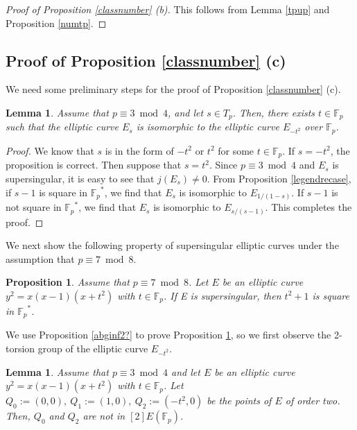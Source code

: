 \documentclass[a4paper, 11pt]{article}
\theoremstyle{plain}
\newtheorem{prop}[defn]{Proposition}
\newtheorem{lem}[defn]{Lemma}
\newcommand{\?}{\textcolor{red}{??}}
\newcommand{\fp}{\mathbb{F}_p}
\begin{document}
\begin{proof}[Proof of Proposition \ref{classnumber} \rm{(b)}]
This follows from Lemma \ref{tpup} and Proposition \ref{numtp}.
    
\end{proof}

\subsection{Proof of Proposition{ \ref{classnumber}} (c)}

We need some preliminary steps for the proof of Proposition \ref{classnumber} (c).

\begin{lem}
\label{exist-t^2}
    Assume that $p \equiv 3\bmod 4 $, and let $s \in T_p$. Then, there exists $t\in \fp$ such that the elliptic curve $E_s$ is isomorphic to the elliptic curve $E_{-t^2}$ over $\fp$.
\end{lem}
\begin{proof}
   We know that $s$ is in the form of $-t^2$ or $t^2 $ for some $ t \in \fp$. If $s=-t^2$, the proposition is correct. Then suppose that $s=t^2$. Since $p \equiv 3 \bmod 4$ and $E_s$ is supersingular, it is easy to see that $j(E_{s}) \neq 0$. From Proposition \ref{legendrecase}, if $s-1$ is square in ${\fp}^{*}$, we find that $E_s$ is isomorphic to $E_{1/(1-s)}$. If $s-1$ is not square in ${\fp}^{*}$, we find that $E_s$ is isomorphic to $E_{s/(s-1)}$. This completes the proof.  
\end{proof}

We next show the following property of supersingular elliptic curves under the assumption that $p \equiv 7 \bmod 8$.

\begin{prop}
\label{t^2+1inf2}
    Assume that $p \equiv 7 \bmod 8$. Let $E$ be an elliptic curve $y^2=x(x-1)(x+t^2)$ with $ t \in \fp$. If E is supersingular, then $t^2+1$ is square in ${\fp}^{*}$.
\end{prop}

We use Proposition \ref{abginf2?} to prove Proposition \ref{t^2+1inf2}, so we first observe the 2-torsion group of the elliptic curve $E_{-t^2}$.


\begin{lem}
    \label{ifker2in2}
    Assume that $p \equiv 3 \bmod 4$ and let $E$ be an elliptic curve $y^2=x(x-1)(x+t^2)$ with $t \in \fp$. Let $Q_0:=(0,0),\ Q_1:=(1,0),\ Q_2:=(-t^2,0)$ be the points of $E$ of order two. Then, $Q_0 $ and $Q_2$ are not in $[2]E(\fp)$.
\end{lem}
\end{document}
